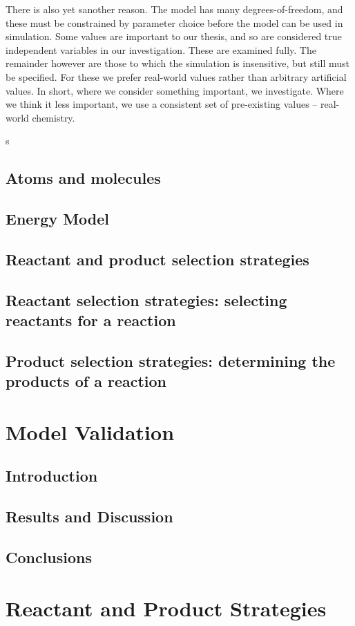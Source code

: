 \documentclass[]{report}
\begin{document}
There is also yet sanother reason. The model has many degrees-of-freedom, and these must be constrained by parameter choice before the model can be used in simulation. Some values are important to our thesis, and so are considered true independent variables in our investigation. These are examined fully. The remainder however are those to which the simulation is insensitive, but still must be specified. For these we prefer real-world values rather than arbitrary artificial values. In short, where we consider something important, we investigate. Where we think it less important, we use a consistent set of pre-existing values -- real-world chemistry.

s\section{Atoms and molecules}
\section{Energy Model}
\section{Reactant and product selection strategies}
\section{Reactant selection strategies: selecting reactants for a reaction}
\section{Product selection strategies: determining the products of a reaction}

\chapter{Model Validation}
\section{Introduction}
\section{Results and Discussion}
\section{Conclusions}

\chapter{Reactant and Product Strategies}
\end{document}
